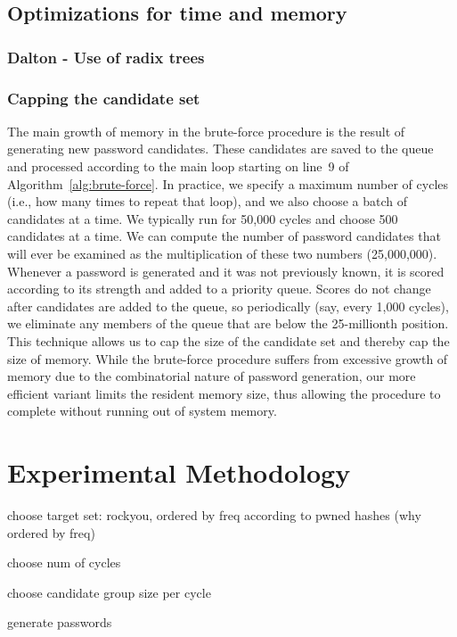 \documentclass[letterpaper,twocolumn,10pt]{article}
\begin{document}
\subsection{Optimizations for time and memory}

\subsubsection{Dalton - Use of radix trees}


\subsubsection{Capping the candidate set}

The main growth of memory in the brute-force procedure is the result of
generating new password candidates. These candidates are saved to the queue and
processed according to the main loop starting on line~9 of
Algorithm~\ref{alg:brute-force}. In practice, we specify a maximum number of
cycles (i.e., how many times to repeat that loop), and we also choose a batch
of candidates at a time. We typically run for 50,000 cycles and choose 500
candidates at a time. We can compute the number of password candidates that
will ever be examined as the multiplication of these two numbers (25,000,000).
Whenever a password is generated and it was not previously known, it is scored
according to its strength and added to a priority queue. Scores do not change
after candidates are added to the queue, so periodically (say, every 1,000
cycles), we eliminate any members of the queue that are below the 25-millionth
position. This technique allows us to cap the size of the candidate set and
thereby cap the size of memory. While the brute-force procedure suffers from
excessive growth of memory due to the combinatorial nature of password
generation, our more efficient variant limits the resident memory size, thus
allowing the procedure to complete without running out of system memory.

\section{Experimental Methodology}

choose target set: rockyou, ordered by freq according to pwned hashes (why
ordered by freq)

choose num of cycles

choose candidate group size per cycle

generate passwords
\end{document}
